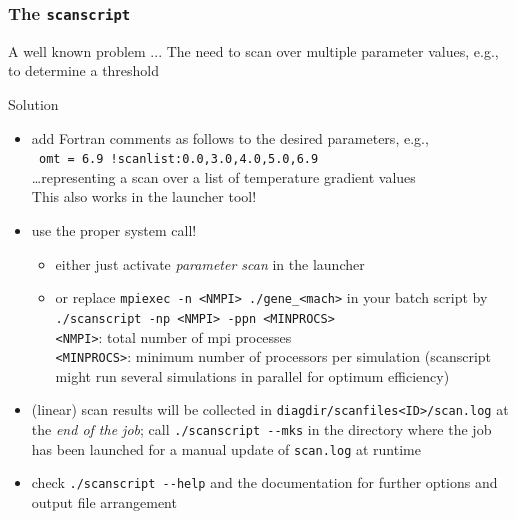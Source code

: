 \documentclass[9pt]{beamer}
\begin{document}
\begin{frame}[fragile]
  \frametitle{The {\tt scanscript}}

\begin{alertblock}{A well known problem ...}
The need to scan over multiple parameter values, e.g., to determine a threshold
\end{alertblock}

\begin{block}{Solution}
\begin{itemize}
 \item add Fortran comments as follows to the desired parameters, e.g., \\
  \verb| omt = 6.9 !scanlist:0.0,3.0,4.0,5.0,6.9| \\
  \ldots representing a scan over a list of temperature gradient values\\
  This also works in the launcher tool!\\[1ex]
 \item use the proper system call!
\begin{itemize}
\item either just activate {\em parameter scan} in the launcher
\item or replace \verb|mpiexec -n <NMPI> ./gene_<mach>| in your batch script by
 \verb|./scanscript -np <NMPI> -ppn <MINPROCS>|\\
 \verb|<NMPI>|: total number of mpi processes\\
 \verb|<MINPROCS>|: minimum number of processors per simulation
 (scanscript might run several simulations in parallel for optimum efficiency)
\end{itemize}
\item (linear) scan results will be collected in \verb|diagdir/scanfiles<ID>/scan.log| at
the {\em end of the job}; call \verb|./scanscript --mks| in the directory where the job
has been launched for a manual update of \verb|scan.log| at runtime
\item check \verb|./scanscript --help| and the documentation for further options
and output file arrangement
\end{itemize}

\end{block}


\end{frame}


\end{document}
